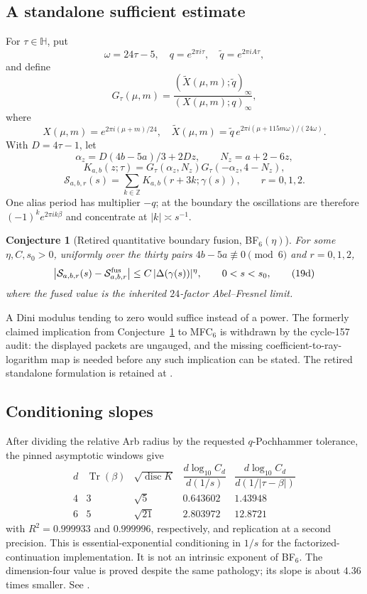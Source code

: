 \documentclass[11pt]{article}
\newtheorem{conjecture}[theorem]{Conjecture}
\newcommand{\Z}{\mathbb Z}
\begin{document}
\subsection*{A standalone sufficient estimate}

For $\tau\in\mathbb H$, put
\[
 \omega=24\tau-5,\quad q=e^{2\pi i\tau},\quad
 \widetilde q=e^{2\pi iA\tau},
\]
and define
\[
 G_\tau(\mu,m)=
 \frac{(\widetilde X(\mu,m);\widetilde q)_\infty}
 {(X(\mu,m);q)_\infty},
\]
where
\[
 X(\mu,m)=e^{2\pi i(\mu+m)/24},\quad
 \widetilde X(\mu,m)=\widetilde q\,
 e^{2\pi i(\mu+115m\omega)/(24\omega)}.
\]
With $D=4\tau-1$, let
\[
 \alpha_z=D(4b-5a)/3+2Dz,\qquad N_z=a+2-6z,
\]
\[
 K_{a,b}(z;\tau)=
 G_\tau(\alpha_z,N_z)G_\tau(-\alpha_z,4-N_z),
\]
\[
 \mathcal S_{a,b,r}(s)=
 \sum_{k\in\Z}K_{a,b}(r+3k;\gamma(s)),
 \qquad r=0,1,2.
\]
One alias period has multiplier $-q$; at the boundary the oscillations
are therefore $(-1)^ke^{2\pi ik\beta}$ and concentrate at
$|k|\asymp s^{-1}$.

\begin{conjecture}[Retired quantitative boundary fusion,
BF$_6(\eta)$]
\label{conj:estimate}
For some $\eta,C,s_0>0$, uniformly over the thirty pairs
$4b-5a\not\equiv0\pmod6$ and $r=0,1,2$,
\[
 \left|\mathcal S_{a,b,r}(s)
 -\mathcal S^{\rm fus}_{a,b,r}\right|
 \le C\,|\Delta(\gamma(s))|^\eta,
 \qquad 0<s<s_0,
\tag{19d}
\]
where the fused value is the inherited $24$-factor Abel--Fresnel limit.
\end{conjecture}

A Dini modulus tending to zero would suffice instead of a power.
The formerly claimed implication from
Conjecture~\ref{conj:estimate} to MFC$_6$ is withdrawn by the
cycle-157 audit: the displayed packets are ungauged, and the missing
coefficient-to-ray-logarithm map is needed before any such implication
can be stated. The retired standalone formulation is retained at
.

\subsection*{Conditioning slopes}

After dividing the relative Arb radius by the requested
$q$-Pochhammer tolerance, the pinned asymptotic windows give
\[
\begin{array}{c|c|c|c|c}
d&\operatorname{Tr}(\beta)&\sqrt{\operatorname{disc}K}
&\dfrac{d\log_{10}C_d}{d(1/s)}
&\dfrac{d\log_{10}C_d}{d(1/|\tau-\beta|)}\\ \hline
4&3&\sqrt5&0.643602&1.43948\\
6&5&\sqrt{21}&2.803972&12.8721
\end{array}
\tag{19e}
\]
with $R^2=0.999933$ and $0.999996$, respectively, and replication at a
second precision.  This is essential-exponential conditioning in
$1/s$ for the factorized-continuation implementation.  It is not an
intrinsic exponent of BF$_6$.  The dimension-four value is proved
despite the same pathology; its slope is about $4.36$ times smaller.
See .
\end{document}
